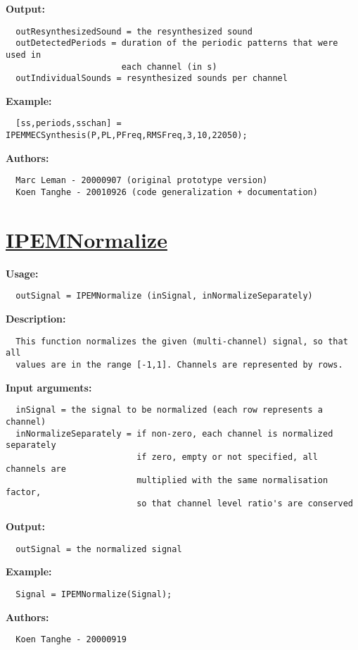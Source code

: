 \textbf{Output:}
\begin{verbatim}  outResynthesizedSound = the resynthesized sound
  outDetectedPeriods = duration of the periodic patterns that were used in
                       each channel (in s)
  outIndividualSounds = resynthesized sounds per channel

\end{verbatim}
\textbf{Example:}
\begin{verbatim}  [ss,periods,sschan] = IPEMMECSynthesis(P,PL,PFreq,RMSFreq,3,10,22050);

\end{verbatim}
\textbf{Authors:}
\begin{verbatim}  Marc Leman - 20000907 (original prototype version)
  Koen Tanghe - 20010926 (code generalization + documentation)
\end{verbatim}


\newpage
\section*{\hyperlink{Concepts:IPEMNormalize}{IPEMNormalize}}
\hypertarget{FuncRef:IPEMNormalize}{}

\textbf{Usage:}
\begin{verbatim}  outSignal = IPEMNormalize (inSignal, inNormalizeSeparately)

\end{verbatim}
\textbf{Description:}
\begin{verbatim}  This function normalizes the given (multi-channel) signal, so that all
  values are in the range [-1,1]. Channels are represented by rows.

\end{verbatim}
\textbf{Input arguments:}
\begin{verbatim}  inSignal = the signal to be normalized (each row represents a channel)
  inNormalizeSeparately = if non-zero, each channel is normalized separately
                          if zero, empty or not specified, all channels are
                          multiplied with the same normalisation factor,
                          so that channel level ratio's are conserved

\end{verbatim}
\textbf{Output:}
\begin{verbatim}  outSignal = the normalized signal

\end{verbatim}
\textbf{Example:}
\begin{verbatim}  Signal = IPEMNormalize(Signal);

\end{verbatim}
\textbf{Authors:}
\begin{verbatim}  Koen Tanghe - 20000919
\end{verbatim}


